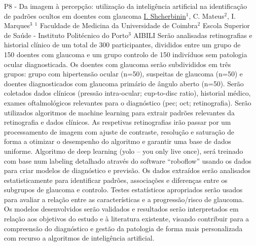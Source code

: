 
    \begin{abstract_online}{P8 - Da imagem à percepção: utilização da inteligência artificial na identificação de padrões ocultos em doentes com glaucoma}{%
        \underline{I. Shcherbinin}$^{1}$, C. Mateus$^{2}$, I. Marques$^{3}$}{%
        }{%
        $^1$ Faculdade de Medicina da Universidade de Coimbra\newline{}$^2$ Escola Superior de Saúde - Instituto Politécnico do Porto\newline{}$^3$ AIBILI}
        Serão analisadas retinografias e historial clínico de um total de 300 participantes, divididos entre um grupo de 150 doentes com glaucoma e um grupo controlo de 150 indivíduos sem patologia ocular diagnosticada. Os doentes com glaucoma serão subdivididos em três grupos: grupo com hipertensão ocular (n=50), suspeitas de glaucoma (n=50) e doentes diagnosticados com glaucoma primário de ângulo aberto (n=50). Serão coletados dados clínicos (pressão intra-ocular; cup-to-disc ratio), historial médico, exames oftalmológicos relevantes para o diagnóstico (pec; oct; retinografia). Serão utilizados algoritmos de machine learning para extrair padrões relevantes da retinografia e dados clínicos. 
As respetivas retinografias irão passar por um processamento de imagem com ajuste de contraste, resolução e saturação de forma a otimizar o desempenho do algoritmo e garantir uma base de dados uniforme. Algoritmo de deep learning (yolo – you only live once), será treinado com base num labeling detalhado através do software “roboflow” usando os dados para criar modelos de diagnóstico e previsão. Os dados extraídos serão analisados estatisticamente para identificar padrões, associações e diferenças entre os subgrupos de glaucoma e controlo. Testes estatísticos apropriados serão usados para avaliar a relação entre as características e a progressão/risco de glaucoma. Os modelos desenvolvidos serão validados e resultados serão interpretados em relação aos objetivos do estudo e à literatura existente, visando contribuir para a compreensão do diagnóstico e gestão da patologia de forma mais personalizada com recurso a algoritmos de inteligência artificial.
    \end{abstract_online}
    
